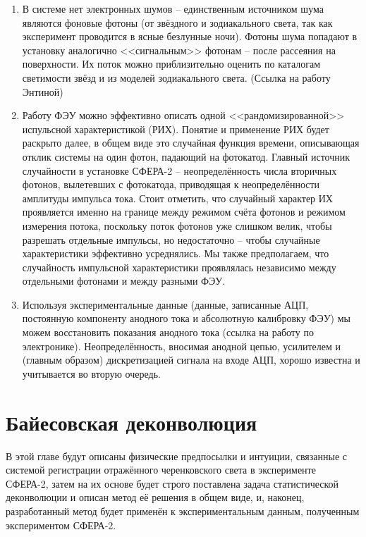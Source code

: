 \documentclass[12pt]{book}
\begin{document}
	\begin{enumerate}
		\item В системе нет электронных шумов -- единственным источником шума являются фоновые фотоны (от звёздного и зодиакального света, так как эксперимент проводится в ясные безлунные ночи). Фотоны шума попадают в установку аналогично <<сигнальным>> фотонам -- после рассеяния на поверхности. Их поток можно приблизительно оценить по каталогам светимости звёзд и из моделей зодиакального света. (Ссылка на работу Энтиной)
		\item Работу ФЭУ можно эффективно описать одной <<рандомизированной>> испульсной характеристикой (РИХ). Понятие и применение РИХ будет раскрыто далее, в общем виде это случайная функция времени, описывающая отклик системы на один фотон, падающий на фотокатод. Главный источник случайности в установке СФЕРА-2 -- неопределённость числа вторичных фотонов, вылетевших с фотокатода, приводящая к неопределённости амплитуды импульса тока. Стоит отметить, что случайный характер ИХ проявляется именно на границе между режимом счёта фотонов и режимом измерения потока, поскольку поток фотонов уже слишком велик, чтобы разрешать отдельные импульсы, но недостаточно -- чтобы случайные характеристики эффективно усреднялись. Мы также предполагаем, что случайность импульсной характеристики проявлялась независимо между отдельными фотонами и между разными ФЭУ.
		\item Используя экспериментальные данные (данные, записанные АЦП, постоянную компоненту анодного тока и абсолютную калибровку ФЭУ) мы можем восстановить показания анодного тока (ссылка на работу по электронике). Неопределённость, вносимая анодной цепью, усилителем и (главным образом) дискретизацией сигнала на входе АЦП, хорошо известна и учитывается во вторую очередь.
	\end{enumerate}

	\chapter{Байесовская деконволюция}
	
	\label{chapt:bayesian-deconvolution}
	
	В этой главе будут описаны физические предпосылки и интуиции, связанные с системой регистрации отражённого черенковского света в эксперименте СФЕРА-2, затем на их основе будет строго поставлена задача статистической деконволюции и описан метод её решения в общем виде, и, наконец, разработанный метод будет применён к экспериментальным данным, полученным экспериментом СФЕРА-2.
	
\end{document}

